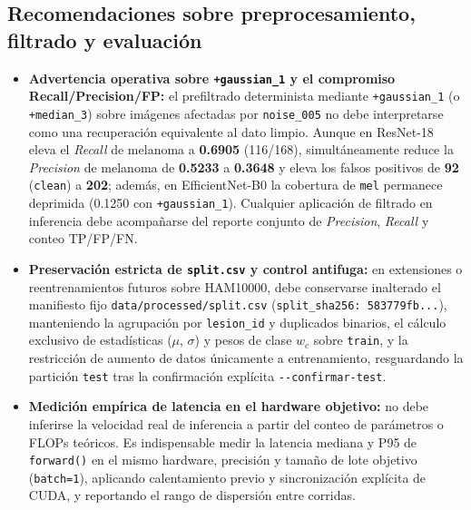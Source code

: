 \subsection{Recomendaciones sobre preprocesamiento, filtrado y evaluación}
\begin{itemize}[leftmargin=1.4em,itemsep=4pt]
\item \textbf{Advertencia operativa sobre \texttt{+gaussian\_1} y el compromiso Recall/Precision/FP:} el prefiltrado determinista mediante \texttt{+gaussian\_1} (o \texttt{+median\_3}) sobre imágenes afectadas por \texttt{noise\_005} no debe interpretarse como una recuperación equivalente al dato limpio. Aunque en ResNet-18 eleva el \textit{Recall} de melanoma a \textbf{0.6905} (116/168), simultáneamente reduce la \textit{Precision} de melanoma de \textbf{0.5233} a \textbf{0.3648} y eleva los falsos positivos de \textbf{92} (\texttt{clean}) a \textbf{202}; además, en EfficientNet-B0 la cobertura de \texttt{mel} permanece deprimida (0.1250 con \texttt{+gaussian\_1}). Cualquier aplicación de filtrado en inferencia debe acompañarse del reporte conjunto de \textit{Precision}, \textit{Recall} y conteo TP/FP/FN.
\item \textbf{Preservación estricta de \texttt{split.csv} y control antifuga:} en extensiones o reentrenamientos futuros sobre HAM10000, debe conservarse inalterado el manifiesto fijo \texttt{data/processed/split.csv} (\texttt{split\_sha256: 583779fb...}), manteniendo la agrupación por \texttt{lesion\_id} y duplicados binarios, el cálculo exclusivo de estadísticas ($\mu$, $\sigma$) y pesos de clase $w_c$ sobre \texttt{train}, y la restricción de aumento de datos únicamente a entrenamiento, resguardando la partición \texttt{test} tras la confirmación explícita \texttt{-{}-confirmar-test}.
\item \textbf{Medición empírica de latencia en el hardware objetivo:} no debe inferirse la velocidad real de inferencia a partir del conteo de parámetros o FLOPs teóricos. Es indispensable medir la latencia mediana y P95 de \texttt{forward()} en el mismo hardware, precisión y tamaño de lote objetivo (\texttt{batch=1}), aplicando calentamiento previo y sincronización explícita de CUDA, y reportando el rango de dispersión entre corridas.
\end{itemize}


